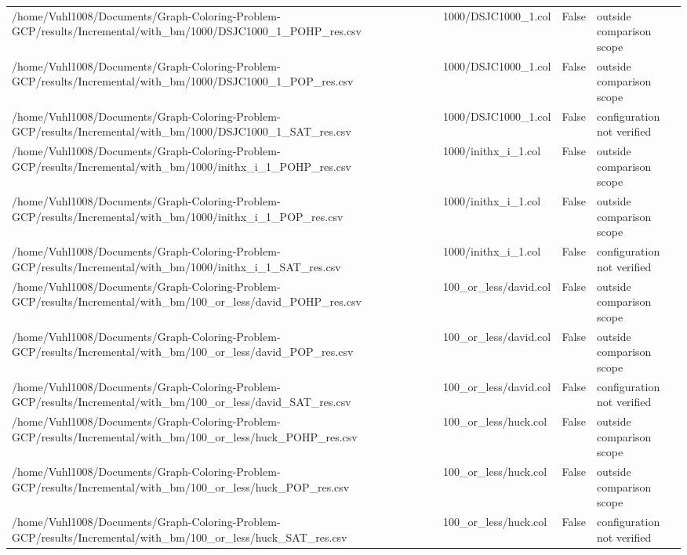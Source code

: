 \begin{table}[htbp]
\begin{tabular}{llll}
/home/Vuhl1008/Documents/Graph-Coloring-Problem-GCP/results/Incremental/with\_bm/1000/DSJC1000\_1\_POHP\_res.csv & 1000/DSJC1000\_1.col & False & outside comparison scope \\
/home/Vuhl1008/Documents/Graph-Coloring-Problem-GCP/results/Incremental/with\_bm/1000/DSJC1000\_1\_POP\_res.csv & 1000/DSJC1000\_1.col & False & outside comparison scope \\
/home/Vuhl1008/Documents/Graph-Coloring-Problem-GCP/results/Incremental/with\_bm/1000/DSJC1000\_1\_SAT\_res.csv & 1000/DSJC1000\_1.col & False & configuration not verified \\
/home/Vuhl1008/Documents/Graph-Coloring-Problem-GCP/results/Incremental/with\_bm/1000/inithx\_i\_1\_POHP\_res.csv & 1000/inithx\_i\_1.col & False & outside comparison scope \\
/home/Vuhl1008/Documents/Graph-Coloring-Problem-GCP/results/Incremental/with\_bm/1000/inithx\_i\_1\_POP\_res.csv & 1000/inithx\_i\_1.col & False & outside comparison scope \\
/home/Vuhl1008/Documents/Graph-Coloring-Problem-GCP/results/Incremental/with\_bm/1000/inithx\_i\_1\_SAT\_res.csv & 1000/inithx\_i\_1.col & False & configuration not verified \\
/home/Vuhl1008/Documents/Graph-Coloring-Problem-GCP/results/Incremental/with\_bm/100\_or\_less/david\_POHP\_res.csv & 100\_or\_less/david.col & False & outside comparison scope \\
/home/Vuhl1008/Documents/Graph-Coloring-Problem-GCP/results/Incremental/with\_bm/100\_or\_less/david\_POP\_res.csv & 100\_or\_less/david.col & False & outside comparison scope \\
/home/Vuhl1008/Documents/Graph-Coloring-Problem-GCP/results/Incremental/with\_bm/100\_or\_less/david\_SAT\_res.csv & 100\_or\_less/david.col & False & configuration not verified \\
/home/Vuhl1008/Documents/Graph-Coloring-Problem-GCP/results/Incremental/with\_bm/100\_or\_less/huck\_POHP\_res.csv & 100\_or\_less/huck.col & False & outside comparison scope \\
/home/Vuhl1008/Documents/Graph-Coloring-Problem-GCP/results/Incremental/with\_bm/100\_or\_less/huck\_POP\_res.csv & 100\_or\_less/huck.col & False & outside comparison scope \\
/home/Vuhl1008/Documents/Graph-Coloring-Problem-GCP/results/Incremental/with\_bm/100\_or\_less/huck\_SAT\_res.csv & 100\_or\_less/huck.col & False & configuration not verified \\

\end{tabular}
\end{table}
